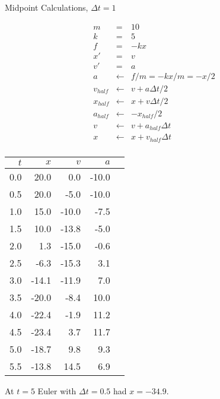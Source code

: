 \documentclass{beamer}
\newcommand{\bframe}[1]{\begin{frame}[fragile]{#1}}
\newcommand{\dt}{\Delta t}
\begin{document}
\bframe{Midpoint Calculations, $\dt=1$}
\begin{minipage}{2in}
\begin{eqnarray*}
m &=& 10  \\
k &=& 5   \\
f &=& -kx \\
x' &=& v \\
v' &=& a \\
a &\leftarrow& f/m = -kx/m = -x/2 \\
v_{half} &\leftarrow& v + a\dt/2\\
x_{half} &\leftarrow& x + v\dt/2 \\
a_{half} &\leftarrow& -x_{half}/2 \\
v &\leftarrow& v + a_{half}\dt\\
x &\leftarrow& x + v_{half}\dt\\
\end{eqnarray*}
\end{minipage}\hfill
\begin{minipage}{2in}

\begin{tabular}{r|rrrr}
$t$ & $x$ & $v$ & $a$ \\\hline
0.0  &  20.0  &  0.0  &  -10.0  &  \\
0.5  &  20.0  &  -5.0  &  -10.0  &  \\
1.0  &  15.0  &  -10.0  &  -7.5  &  \\
1.5  &  10.0  &  -13.8  &  -5.0  &  \\
2.0  &  1.3  &  -15.0  &  -0.6  &  \\
2.5  &  -6.3  &  -15.3  &  3.1  &  \\
3.0  &  -14.1  &  -11.9  &  7.0  &  \\
3.5  &  -20.0  &  -8.4  &  10.0  &  \\
4.0  &  -22.4  &  -1.9  &  11.2  &  \\
4.5  &  -23.4  &  3.7  &  11.7  &  \\
5.0  &  -18.7  &  9.8  &  9.3  &  \\
5.5  &  -13.8  &  14.5  &  6.9  &  \\
\end{tabular}

\end{minipage}

\hfill At $t=5$ Euler with $\dt=0.5$ had $x=-34.9$.

\end{frame}
\end{document}
